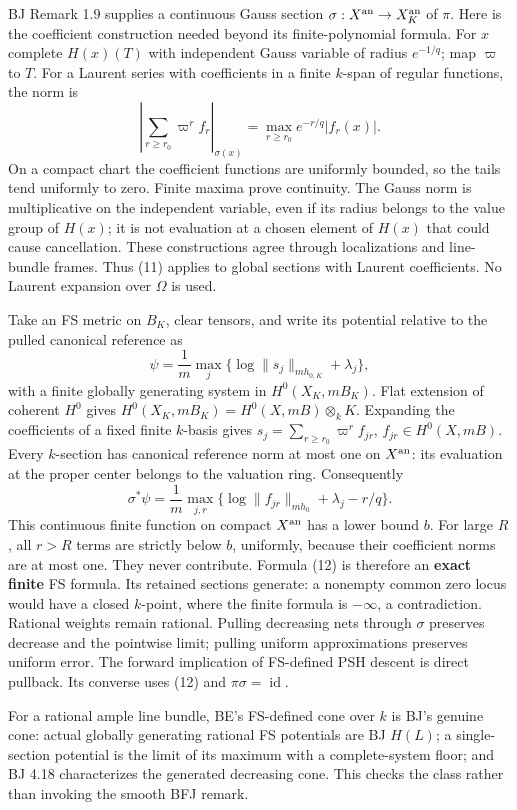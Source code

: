 \documentclass[
  11pt,
]{article}
\begin{document}
BJ Remark 1.9 supplies a continuous Gauss section
\(\sigma:X^{\rm an}\to X_K^{\rm an}\) of \(\pi\). Here is the
coefficient construction needed beyond its finite-polynomial formula.
For \(x\) complete \(H(x)(T)\) with independent Gauss variable of radius
\(e^{-1/q}\); map \(\varpi\) to \(T\). For a Laurent series with
coefficients in a finite \(k\)-span of regular functions, the norm is
\[\left|\sum_{r\ge r_0}\varpi^r f_r\right|_{\sigma(x)}
                =\max_{r\ge r_0}e^{-r/q}|f_r(x)|. \tag{11}\] On a
compact chart the coefficient functions are uniformly bounded, so the
tails tend uniformly to zero. Finite maxima prove continuity. The Gauss
norm is multiplicative on the independent variable, even if its radius
belongs to the value group of \(H(x)\); it is not evaluation at a chosen
element of \(H(x)\) that could cause cancellation. These constructions
agree through localizations and line-bundle frames. Thus (11) applies to
global sections with Laurent coefficients. No Laurent expansion over
\(\Omega\) is used.

Take an FS metric on \(B_K\), clear tensors, and write its potential
relative to the pulled canonical reference as
\[\psi=\frac1m\max_j\{\log\|s_j\|_{mh_{0,K}}+\lambda_j\},\] with a
finite globally generating system in \(H^0(X_K,mB_K)\). Flat extension
of coherent \(H^0\) gives \(H^0(X_K,mB_K)=H^0(X,mB)\otimes_kK\).
Expanding the coefficients of a fixed finite \(k\)-basis gives
\(s_j=\sum_{r\ge r_0}\varpi^r f_{jr}\), \(f_{jr}\in H^0(X,mB)\). Every
\(k\)-section has canonical reference norm at most one on
\(X^{\rm an}\): its evaluation at the proper center belongs to the
valuation ring. Consequently \[\sigma^*\psi=\frac1m\max_{j,r}
           \{\log\|f_{jr}\|_{mh_0}+\lambda_j-r/q\}. \tag{12}\] This
continuous finite function on compact \(X^{\rm an}\) has a lower bound
\(b\). For large \(R\), all \(r>R\) terms are strictly below \(b\),
uniformly, because their coefficient norms are at most one. They never
contribute. Formula (12) is therefore an \textbf{exact finite} FS
formula. Its retained sections generate: a nonempty common zero locus
would have a closed \(k\)-point, where the finite formula is
\(-\infty\), a contradiction. Rational weights remain rational. Pulling
decreasing nets through \(\sigma\) preserves decrease and the pointwise
limit; pulling uniform approximations preserves uniform error. The
forward implication of FS-defined PSH descent is direct pullback. Its
converse uses (12) and \(\pi\sigma=\operatorname{id}\).

For a rational ample line bundle, BE's FS-defined cone over \(k\) is
BJ's genuine cone: actual globally generating rational FS potentials are
BJ \(H(L)\); a single-section potential is the limit of its maximum with
a complete-system floor; and BJ 4.18 characterizes the generated
decreasing cone. This checks the class rather than invoking the smooth
BFJ remark.
\end{document}

